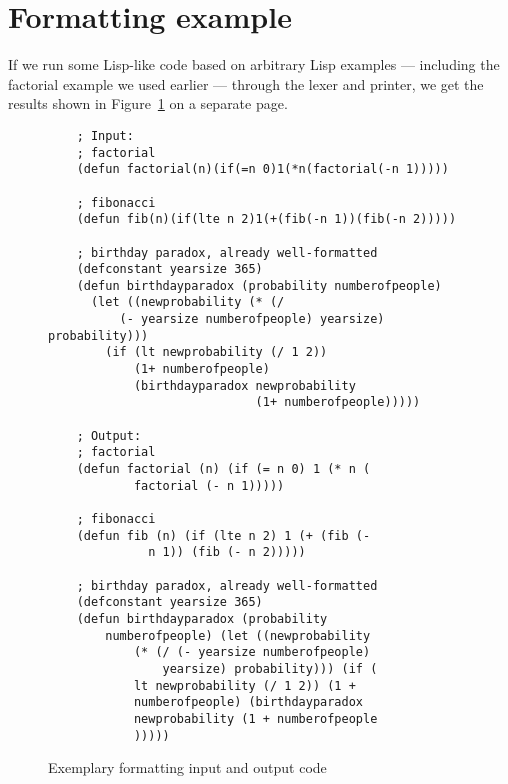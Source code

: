 \section{Formatting example}
If we run some Lisp-like code
based on arbitrary Lisp examples
\autocite{factorialExample}
\autocite{fibonacciExample}
\autocite{birthdayExample}
--- including the factorial example we used earlier ---
through the lexer and printer,
we get the results shown in Figure~\ref{fig:formattingExample}
on a separate page.

\begin{figure}[p]
  \begin{verbatim}
    ; Input:
    ; factorial
    (defun factorial(n)(if(=n 0)1(*n(factorial(-n 1)))))

    ; fibonacci
    (defun fib(n)(if(lte n 2)1(+(fib(-n 1))(fib(-n 2)))))

    ; birthday paradox, already well-formatted
    (defconstant yearsize 365)
    (defun birthdayparadox (probability numberofpeople)
      (let ((newprobability (* (/
          (- yearsize numberofpeople) yearsize) probability)))
        (if (lt newprobability (/ 1 2))
            (1+ numberofpeople)
            (birthdayparadox newprobability
                             (1+ numberofpeople)))))

    ; Output:
    ; factorial
    (defun factorial (n) (if (= n 0) 1 (* n (
            factorial (- n 1)))))

    ; fibonacci
    (defun fib (n) (if (lte n 2) 1 (+ (fib (-
              n 1)) (fib (- n 2)))))

    ; birthday paradox, already well-formatted
    (defconstant yearsize 365)
    (defun birthdayparadox (probability
        numberofpeople) (let ((newprobability
            (* (/ (- yearsize numberofpeople)
                yearsize) probability))) (if (
            lt newprobability (/ 1 2)) (1 +
            numberofpeople) (birthdayparadox
            newprobability (1 + numberofpeople
            )))))
  \end{verbatim}
  \caption{Exemplary formatting input and
    output code}\label{fig:formattingExample}
\end{figure}
